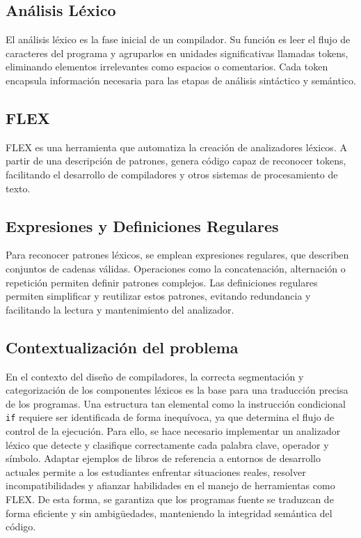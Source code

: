 \documentclass{article}
\begin{document}
\subsection*{Análisis Léxico}

El análisis léxico es la fase inicial de un compilador. Su función es leer el flujo de caracteres del programa y agruparlos en unidades significativas llamadas tokens, eliminando elementos irrelevantes como espacios o comentarios. Cada token encapsula información necesaria para las etapas de análisis sintáctico y semántico.

\subsection*{FLEX}

FLEX es una herramienta que automatiza la creación de analizadores léxicos. A partir de una descripción de patrones, genera código capaz de reconocer tokens, facilitando el desarrollo de compiladores y otros sistemas de procesamiento de texto.

\subsection*{Expresiones y Definiciones Regulares}

Para reconocer patrones léxicos, se emplean expresiones regulares, que describen conjuntos de cadenas válidas. Operaciones como la concatenación, alternación o repetición permiten definir patrones complejos. Las definiciones regulares permiten simplificar y reutilizar estos patrones, evitando redundancia y facilitando la lectura y mantenimiento del analizador.

\subsection{Contextualización del problema}

En el contexto del diseño de compiladores, la correcta segmentación y categorización de los componentes léxicos es la base para una traducción precisa de los programas. Una estructura tan elemental como la instrucción condicional \texttt{if} requiere ser identificada de forma inequívoca, ya que determina el flujo de control de la ejecución. Para ello, se hace necesario implementar un analizador léxico que detecte y clasifique correctamente cada palabra clave, operador y símbolo. Adaptar ejemplos de libros de referencia a entornos de desarrollo actuales permite a los estudiantes enfrentar situaciones reales, resolver incompatibilidades y afianzar habilidades en el manejo de herramientas como FLEX. De esta forma, se garantiza que los programas fuente se traduzcan de forma eficiente y sin ambigüedades, manteniendo la integridad semántica del código.
\end{document}
